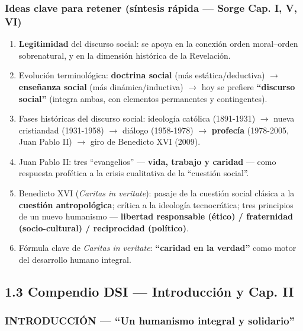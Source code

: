 \documentclass[10pt,a4paper]{article}
\begin{document}
\subsubsection{Ideas clave para retener (síntesis rápida --- Sorge Cap. I, V, VI)}
\begin{enumerate}
\item \textbf{Legitimidad} del discurso social: se apoya en la conexión orden moral--orden sobrenatural, y en la dimensión histórica de la Revelación.
\item Evolución terminológica: \textbf{doctrina social} (más estática/deductiva) $\rightarrow$ \textbf{enseñanza social} (más dinámica/inductiva) $\rightarrow$ hoy se prefiere \textbf{``discurso social''} (integra ambas, con elementos permanentes y contingentes).
\item Fases históricas del discurso social: ideología católica (1891-1931) $\rightarrow$ nueva cristiandad (1931-1958) $\rightarrow$ diálogo (1958-1978) $\rightarrow$ \textbf{profecía} (1978-2005, Juan Pablo II) $\rightarrow$ giro de Benedicto XVI (2009).
\item Juan Pablo II: tres ``evangelios'' --- \textbf{vida, trabajo y caridad} --- como respuesta profética a la crisis cualitativa de la ``cuestión social''.
\item Benedicto XVI (\textit{Caritas in veritate}): pasaje de la cuestión social clásica a la \textbf{cuestión antropológica}; crítica a la ideología tecnocrática; tres principios de un nuevo humanismo --- \textbf{libertad responsable (ético) / fraternidad (socio-cultural) / reciprocidad (político)}.
\item Fórmula clave de \textit{Caritas in veritate}: \textbf{``caridad en la verdad''} como motor del desarrollo humano integral.
\end{enumerate}



\subsection{1.3 Compendio DSI --- Introducción y Cap. II}

\subsubsection{INTRODUCCIÓN --- ``Un humanismo integral y solidario''}
\end{document}
